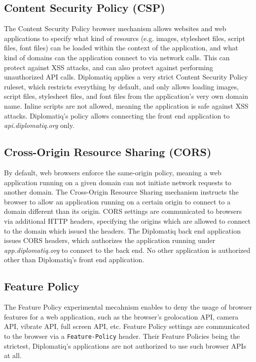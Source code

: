 \subsection{Content Security Policy (CSP)}

The Content Security Policy browser mechanism allows websites and web applications to specify what kind of resourcs (e.g. images, stylesheet files, script files, font files) can be loaded within the context of the application, and what kind of domains can the application connect to via network calls. This can protect against XSS attacks, and can also protect against performing unauthorized API calls. Diplomatiq applies a very strict Content Security Policy ruleset, which restricts everything by default, and only allows loading images, script files, stylesheet files, and font files from the application's very own domain name. Inline scripts are not allowed, meaning the application is safe against XSS attacks. Diplomatiq's policy allows connecting the front end application to \emph{api.diplomatiq.org} only.

\subsection{Cross-Origin Resource Sharing (CORS)}

By default, web browsers enforce the same-origin policy, meaning a web application running on a given domain can not initiate network requests to another domain. The Cross-Origin Resource Sharing mechanism instructs the browser to allow an application running on a certain origin to connect to a domain different than its origin. CORS settings are communicated to browsers via additional HTTP headers, specifying the origins which are allowed to connect to the domain which issued the headers. The Diplomatiq back end application issues CORS headers, which authorizes the application running under \emph{app.diplomatiq.org} to connect to the back end. No other application is authorized other than Diplomatiq's front end application.

\subsection{Feature Policy}

The Feature Policy experimental mecahnism enables to deny the usage of browser features for a web application, such as the browser's geolocation API, camera API, vibrate API, full screen API, etc. Feature Policy settings are communicated to the browser via a \lstinline{Feature-Policy} header. Their Feature Policies being the strictest, Diplomatiq's applications are not authorized to use such browser APIs at all.

